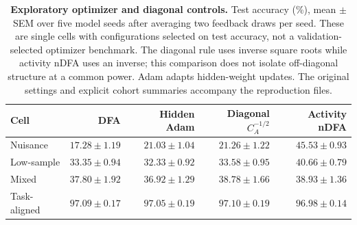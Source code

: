 \begin{table}[!htbp]
\centering\small
\setlength{\tabcolsep}{4pt}
\begin{tabular}{@{}lrrrr@{}}
\toprule
Cell & DFA & Hidden Adam & Diagonal $C_A^{-1/2}$ & Activity nDFA \\
\midrule
Nuisance & $17.28\pm1.19$ & $21.03\pm1.04$ & $21.26\pm1.22$ & $45.53\pm0.93$ \\
Low-sample & $33.35\pm0.94$ & $32.33\pm0.92$ & $33.58\pm0.95$ & $40.66\pm0.79$ \\
Mixed & $37.80\pm1.92$ & $36.92\pm1.29$ & $38.78\pm1.66$ & $38.93\pm1.36$ \\
Task-aligned & $97.09\pm0.17$ & $97.05\pm0.19$ & $97.10\pm0.19$ & $96.98\pm0.14$ \\
\bottomrule
\end{tabular}
\caption{\textbf{Exploratory optimizer and diagonal controls.} Test accuracy (\%), mean $\pm$ SEM over five model seeds after averaging two feedback draws per seed. These are single cells with configurations selected on test accuracy, not a validation-selected optimizer benchmark. The diagonal rule uses inverse square roots while activity nDFA uses an inverse; this comparison does not isolate off-diagonal structure at a common power. Adam adapts hidden-weight updates. The original settings and explicit cohort summaries accompany the reproduction files.}
\label{tab:infodfa_adam_control}
\end{table}
